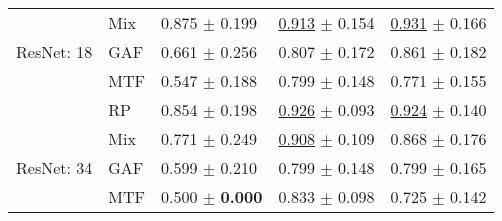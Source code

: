 \begin{tabular}{lllll}
 & Mix & \textcolor[rgb]{0.0932203390,0.5000000000,0}{0.875} $\pm$ \textcolor[rgb]{0.7489308619,0.2510691381,0}{0.199} & \underline{\textcolor[rgb]{0.2283511269,0.5000000000,0}{0.913}} $\pm$ \textcolor[rgb]{0.7681030633,0.2318969367,0}{0.154} & \underline{\textcolor[rgb]{0.0526315789,0.5000000000,0}{0.931}} $\pm$ \textcolor[rgb]{0.2342744058,0.5000000000,0}{0.166} \\
ResNet: 18 & GAF & \textcolor[rgb]{0.5728813559,0.4271186441,0}{0.661} $\pm$ \textcolor[rgb]{0.9624354790,0.0375645210,0}{0.256} & \textcolor[rgb]{0.8111901938,0.1888098062,0}{0.807} $\pm$ \textcolor[rgb]{0.9493323314,0.0506676686,0}{0.172} & \textcolor[rgb]{0.3157894737,0.5000000000,0}{0.861} $\pm$ \textcolor[rgb]{0.3329018876,0.5000000000,0}{0.182} \\
 & MTF & \textcolor[rgb]{0.8271186441,0.1728813559,0}{0.547} $\pm$ \textcolor[rgb]{0.7063509212,0.2936490788,0}{0.188} & \textcolor[rgb]{0.8546856465,0.1453143535,0}{0.799} $\pm$ \textcolor[rgb]{0.7094231768,0.2905768232,0}{0.148} & \textcolor[rgb]{0.6578947368,0.3421052632,0}{0.771} $\pm$ \textcolor[rgb]{0.1699387006,0.5000000000,0}{0.155} \\
 & RP & \textcolor[rgb]{0.1398305085,0.5000000000,0}{0.854} $\pm$ \textcolor[rgb]{0.7444595929,0.2555404071,0}{0.198} & \underline{\textcolor[rgb]{0.1565836299,0.5000000000,0}{0.926}} $\pm$ \textcolor[rgb]{0.1835466762,0.5000000000,0}{0.093} & \underline{\textcolor[rgb]{0.0789473684,0.5000000000,0}{0.924}} $\pm$ \textcolor[rgb]{0.0750675489,0.5000000000,0}{0.140} \\
 & Mix & \textcolor[rgb]{0.3262711864,0.5000000000,0}{0.771} $\pm$ \textcolor[rgb]{0.9352715680,0.0647284320,0}{0.249} & \underline{\textcolor[rgb]{0.2566231712,0.5000000000,0}{0.908}} $\pm$ \textcolor[rgb]{0.3380258320,0.5000000000,0}{0.109} & \textcolor[rgb]{0.2894736842,0.5000000000,0}{0.868} $\pm$ \textcolor[rgb]{0.2929200830,0.5000000000,0}{0.176} \\
ResNet: 34 & GAF & \textcolor[rgb]{0.7115819209,0.2884180791,0}{0.599} $\pm$ \textcolor[rgb]{0.7873909879,0.2126090121,0}{0.210} & \textcolor[rgb]{0.8546856465,0.1453143535,0}{0.799} $\pm$ \textcolor[rgb]{0.7094231768,0.2905768232,0}{0.148} & \textcolor[rgb]{0.5526315789,0.4473684211,0}{0.799} $\pm$ \textcolor[rgb]{0.2256144330,0.5000000000,0}{0.165} \\
 & MTF & \textcolor[rgb]{0.9322033898,0.0677966102,0}{0.500} $\pm$ \textbf{\textcolor[rgb]{0.0000000000,0.5000000000,0}{0.000}} & \textcolor[rgb]{0.6654804270,0.3345195730,0}{0.833} $\pm$ \textcolor[rgb]{0.2351321773,0.5000000000,0}{0.098} & \textcolor[rgb]{0.8315789474,0.1684210526,0}{0.725} $\pm$ \textcolor[rgb]{0.0883980035,0.5000000000,0}{0.142} \\

\end{tabular}
